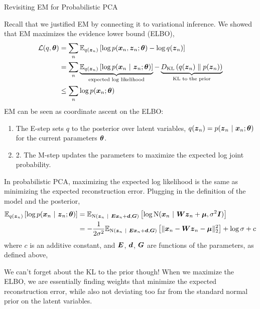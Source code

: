 \documentclass[aspectratio=169]{beamer}
\begin{document}
\begin{frame}[t,allowframebreaks]{Revisiting EM for Probabilistic
PCA}\label{revisiting-em-for-probabilistic-pca}

Recall that we justified EM by connecting it to variational inference.
We showed that EM maximizes the evidence lower bound (ELBO),
\begin{align*}
\mathcal{L}(q, \boldsymbol{\theta}) 
&= \sum_n \mathbb{E}_{q(\boldsymbol{z}_n)}\left[\log p(\boldsymbol{x}_n, \boldsymbol{z}_n; \boldsymbol{\theta}) - \log q(\boldsymbol{z}_n) \right] \\
&= \sum_n \underbrace{\mathbb{E}_{q(\boldsymbol{z}_n)}\left[\log p(\boldsymbol{x}_n ~\vert~ \boldsymbol{z}_n; \boldsymbol{\theta})\right]}_{\text{expected log likelihood}} - \underbrace{D_{\textrm{KL}}\left(q(\boldsymbol{z}_n)\;\|\;p(\boldsymbol{z}_n)\right)}_{\text{KL to the prior}} \\
&\leq \sum_n \log p(\boldsymbol{x}_n; \boldsymbol{\theta})
\end{align*} 
EM can be seen as coordinate ascent on the ELBO: 
\begin{enumerate}
    \item The E-step sets \(q\) to the posterior over latent variables, \(q(\boldsymbol{z}_n) = p(\boldsymbol{z}_n ~\vert~ \boldsymbol{x}_n; \boldsymbol{\theta})\) for the current parameters \(\boldsymbol{\theta}\). 
    \item 2. The M-step updates the parameters to maximize the expected log joint probability.
\end{enumerate}

In probabilistic PCA, maximizing the expected log likelihood is the same
as minimizing the expected reconstruction error. Plugging in the
definition of the model and the posterior, 
\begin{align*}
\mathbb{E}_{q(\boldsymbol{z}_n)}\left[\log p(\boldsymbol{x}_n ~\vert~ \boldsymbol{z}_n; \boldsymbol{\theta})\right]
&= \mathbb{E}_{\mathrm{N}(\boldsymbol{z}_n ~\vert~ \boldsymbol{E} \boldsymbol{x}_n + \boldsymbol{d}, \boldsymbol{G})}\left[\log \mathrm{N}(\boldsymbol{x}_n ~\vert~ \boldsymbol{W} \boldsymbol{z}_n + \boldsymbol{\mu}, \sigma^2 \boldsymbol{I}) \right] \\
&= -\frac{1}{2\sigma^2 }\mathbb{E}_{\mathrm{N}(\boldsymbol{z}_n ~\vert~ \boldsymbol{E} \boldsymbol{x}_n + \boldsymbol{d}, \boldsymbol{G})}\left[\|\boldsymbol{x}_n - \boldsymbol{W} \boldsymbol{z}_n - \boldsymbol{\mu} \|_2^2 \right] + \log \sigma + c \\
\end{align*} 
where \(c\) is an additive constant, and \(\boldsymbol{E}\),
\(\boldsymbol{d}\), \(\boldsymbol{G}\) are functions of the parameters, as defined above,

We can't forget about the KL to the prior though! When we maximize the
ELBO, we are essentially finding weights that minimize the expected
reconstruction error, while also not deviating too far from the standard
normal prior on the latent variables.
\end{frame}
\end{document}
